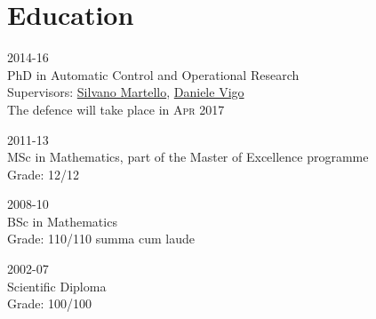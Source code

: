\section*{Education}

\begin{paracol}{2}
  \textsc{2014-16}
\switchcolumn
  \\
  PhD in Automatic Control and Operational Research\\
  Supervisors: \href{https://scholar.google.com/citations?user=o4a20zsAAAAJ}{Silvano Martello}, \href{https://scholar.google.com/citations?user=2kk8d_AAAAAJ}{Daniele Vigo}\\
  The defence will take place in \textsc{Apr 2017}
\end{paracol}

\begin{paracol}{2}
  \textsc{2011-13}
\switchcolumn
  \\
  MSc in Mathematics, part of the Master of Excellence programme\\
  Grade: 12/12
\end{paracol}

\begin{paracol}{2}
  \textsc{2008-10}
\switchcolumn
  \\
  BSc in Mathematics\\
  Grade: 110/110 summa cum laude
\end{paracol}

\begin{paracol}{2}
  \textsc{2002-07}
\switchcolumn
  \\
  Scientific Diploma\\
  Grade: 100/100
\end{paracol}
